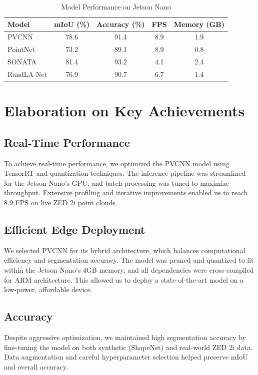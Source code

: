 \documentclass[12pt,a4paper]{report}
\begin{document}
\begin{table}[htbp]
    \centering
    \caption{Model Performance on Jetson Nano}
    \label{tab:model_perf}
    \begin{tabular}{lcccc}
        \toprule
        Model & mIoU (\%) & Accuracy (\%) & FPS & Memory (GB) \\
        \midrule
        PVCNN & 78.6 & 91.4 & 8.9 & 1.9 \\
        PointNet & 73.2 & 89.1 & 8.9 & 0.8 \\
        SONATA & 81.4 & 93.2 & 4.1 & 2.4 \\
        RandLA-Net & 76.9 & 90.7 & 6.7 & 1.4 \\
        \bottomrule
    \end{tabular}
\end{table}

\chapter{Elaboration on Key Achievements}
\section{Real-Time Performance}
To achieve real-time performance, we optimized the PVCNN model using TensorRT and quantization techniques. The inference pipeline was streamlined for the Jetson Nano’s GPU, and batch processing was tuned to maximize throughput. Extensive profiling and iterative improvements enabled us to reach 8.9 FPS on live ZED 2i point clouds.

\section{Efficient Edge Deployment}
We selected PVCNN for its hybrid architecture, which balances computational efficiency and segmentation accuracy. The model was pruned and quantized to fit within the Jetson Nano’s 4GB memory, and all dependencies were cross-compiled for ARM architecture. This allowed us to deploy a state-of-the-art model on a low-power, affordable device.

\section{Accuracy}
Despite aggressive optimization, we maintained high segmentation accuracy by fine-tuning the model on both synthetic (ShapeNet) and real-world ZED 2i data. Data augmentation and careful hyperparameter selection helped preserve mIoU and overall accuracy.
\end{document}
